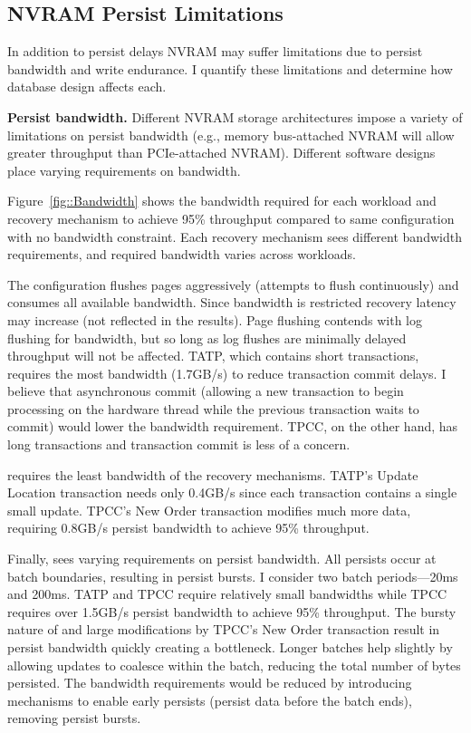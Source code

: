 \subsection{NVRAM Persist Limitations}
\label{sec:OLTP_eval:Persists:Limitations}

In addition to persist delays NVRAM may suffer limitations due to persist bandwidth and write endurance.
I quantify these limitations and determine how database design affects each.

\textbf{Persist bandwidth.}
Different NVRAM storage architectures impose a variety of limitations on persist bandwidth (e.g., memory bus-attached NVRAM will allow greater throughput than PCIe-attached NVRAM).
Different software designs place varying requirements on bandwidth.


Figure~\ref{fig::Bandwidth} shows the bandwidth required for each workload and recovery mechanism to achieve 95\% throughput compared to same configuration with no bandwidth constraint.
Each recovery mechanism sees different bandwidth requirements, and required bandwidth varies across workloads.

The \NVDisk configuration flushes pages aggressively (attempts to flush continuously) and consumes all available bandwidth.
Since bandwidth is restricted recovery latency may increase (not reflected in the results).
Page flushing contends with log flushing for bandwidth, but so long as log flushes are minimally delayed throughput will not be affected.
TATP, which contains short transactions, requires the most bandwidth (1.7GB/s) to reduce transaction commit delays.
I believe that asynchronous commit (allowing a new transaction to begin processing on the hardware thread while the previous transaction waits to commit) would lower the bandwidth requirement.
TPCC, on the other hand, has long transactions and transaction commit is less of a concern.

\InPlace requires the least bandwidth of the recovery mechanisms.
TATP's Update Location transaction needs only 0.4GB/s since each transaction contains a single small update.
TPCC's New Order transaction modifies much more data, requiring 0.8GB/s persist bandwidth to achieve 95\% throughput.

Finally, \GroupCommit sees varying requirements on persist bandwidth.
All persists occur at batch boundaries, resulting in persist bursts.
I consider two batch periods---20ms and 200ms.
TATP and TPCC require relatively small bandwidths while TPCC requires over 1.5GB/s persist bandwidth to achieve 95\% throughput.
The bursty nature of \GroupCommit and large modifications by TPCC's New Order transaction result in persist bandwidth quickly creating a bottleneck.
Longer batches help slightly by allowing updates to coalesce within the batch, reducing the total number of bytes persisted.
The bandwidth requirements would be reduced by introducing mechanisms to enable early persists (persist data before the batch ends), removing persist bursts.

